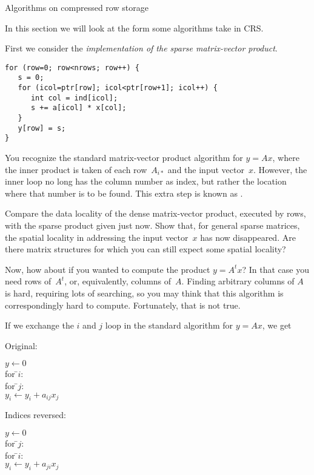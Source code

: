  {Algorithms on compressed row storage}
\label{sec:crs-mvp}

In this section we will look at the form
some algorithms take in \ac{CRS}.

First we consider the \emph{implementation of the sparse matrix-vector
  product}.
\begin{verbatim}
for (row=0; row<nrows; row++) {
   s = 0;
   for (icol=ptr[row]; icol<ptr[row+1]; icol++) {
      int col = ind[icol];
      s += a[icol] * x[col];
   }
   y[row] = s;
}
\end{verbatim}
You recognize the standard matrix-vector product algorithm for $y=Ax$,
where the inner product is taken of each row~$A_{i*}$ and the input
vector~$x$. However, the inner loop no long has the column
number as index, but rather the location where that number is to be
found. This extra step is known as .

\begin{exercise}
  Compare the data locality of the dense matrix-vector product, executed by rows,
  with the sparse product given just now. Show that, for general sparse matrices,
  the spatial locality in addressing
  the input vector~$x$ has now disappeared. Are there matrix structures for which
  you can still expect some spatial locality?
\end{exercise}

Now, how about if you wanted to compute the product $y=A^tx$? In that
case you need rows of~$A^t$, or, equivalently, columns of~$A$. Finding
arbitrary columns of $A$ is hard, requiring lots of searching, so you may
think that this algorithm is correspondingly hard to
compute. Fortunately, that is not true.

If we exchange the $i$ and $j$ loop in the standard algorithm for
$y=Ax$, we get
\begin{multicols}{2}
  Original:
  \begin{tabbing}
    $y\leftarrow 0$\\
    for \=$i$:\\
    \> for \=$j$:\\
    \>\> $y_i\leftarrow y_i+a_{ij}x_j$
  \end{tabbing}
  \columnbreak
  Indices reversed:
  \begin{tabbing}
    $y\leftarrow 0$\\
    for \=$j$:\\
    \> for \=$i$:\\
    \>\> $y_i\leftarrow y_i+a_{ji}x_j$
  \end{tabbing}
\end{multicols}

